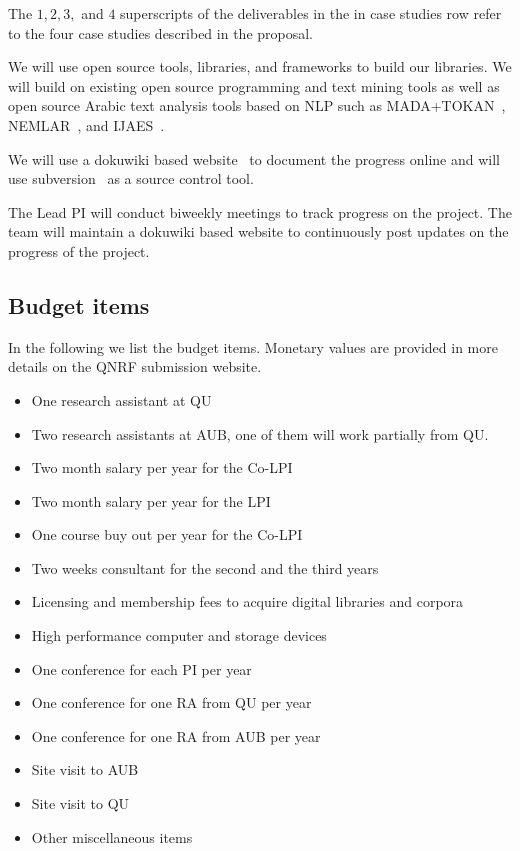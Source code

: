 \documentclass[12pt]{article}
\begin{document}
{The $1,2,3,$ and $4$
superscripts of the deliverables in the 
in case studies row refer to the four 
case studies described in the proposal. 

We will use open source tools, libraries, and frameworks to 
build our libraries.
We will build on existing open source programming and text 
mining tools as well as open source Arabic text analysis tools 
based on NLP such as MADA+TOKAN~\cite{Rot08}, 
NEMLAR~\cite{RAl09}, and IJAES~\cite{Int09}.

We will use a dokuwiki based website~\cite{Dok09} 
to document the progress online and will use 
subversion~\cite{Sub09} as a source control tool.
 
The Lead PI will conduct biweekly meetings to track progress 
on the project.
The team will maintain a dokuwiki based website to continuously 
post updates on the progress of the project.


\subsection{Budget items}

In the following we list the budget items. 
Monetary values are provided in more details on the QNRF 
submission website. 

\begin{itemize}
\item One research assistant at QU
\item Two research assistants at AUB, one of them will 
work partially from QU. 
\item Two month salary per year for the Co-LPI
\item Two month salary per year for the LPI
\item One course buy out per year for the Co-LPI
\item Two weeks consultant for the second and the third years
\item Licensing and membership fees to acquire digital libraries and corpora
\item High performance computer and storage devices
\item One conference for each PI per year
\item One conference for one RA from QU per year
\item One conference for one RA from AUB per year
\item Site visit to AUB 
\item Site visit to QU 
\item Other miscellaneous items
\end{itemize}


}
\end{document}
